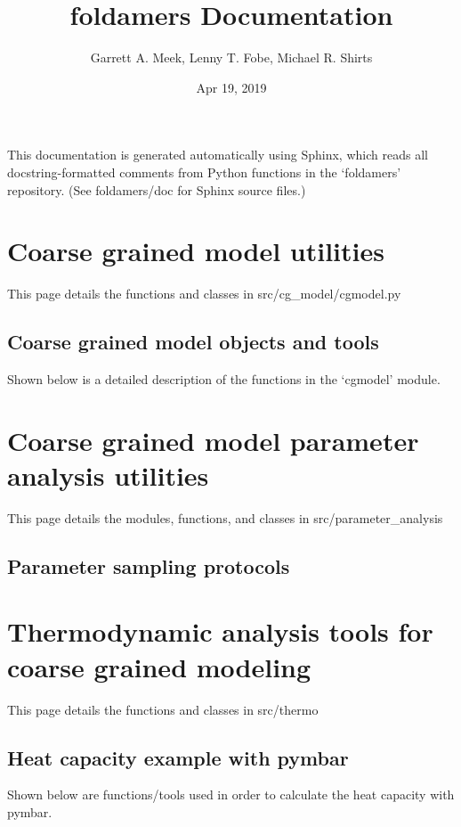 \documentclass[letterpaper,12pt,english,openany,twoside]{sphinxmanual}
\title{foldamers Documentation}
\date{Apr 19, 2019}
\author{Garrett A. Meek, Lenny T. Fobe, Michael R. Shirts}
\begin{document}
\pagestyle{empty}
\sphinxmaketitle
\pagestyle{plain}
\sphinxtableofcontents
\pagestyle{normal}
\label{\detokenize{index::doc}}


This documentation is generated automatically using Sphinx, which reads
all docstring-formatted comments from Python functions in
the ‘foldamers’ repository.  (See foldamers/doc for Sphinx
source files.)


\chapter{Coarse grained model utilities}
\label{\detokenize{cg_model:coarse-grained-model-utilities}}\label{\detokenize{cg_model::doc}}
This page details the functions and classes in src/cg\_model/cgmodel.py


\section{Coarse grained model objects and tools}
\label{\detokenize{cg_model:coarse-grained-model-objects-and-tools}}
Shown below is a detailed description of the functions in the ‘cgmodel’
module.


\chapter{Coarse grained model parameter analysis utilities}
\label{\detokenize{parameter_analysis:coarse-grained-model-parameter-analysis-utilities}}\label{\detokenize{parameter_analysis::doc}}
This page details the modules, functions, and classes
in src/parameter\_analysis


\section{Parameter sampling protocols}
\label{\detokenize{parameter_analysis:parameter-sampling-protocols}}

\chapter{Thermodynamic analysis tools for coarse grained modeling}
\label{\detokenize{thermo:thermodynamic-analysis-tools-for-coarse-grained-modeling}}\label{\detokenize{thermo::doc}}
This page details the functions and classes in src/thermo


\section{Heat capacity example with pymbar}
\label{\detokenize{thermo:heat-capacity-example-with-pymbar}}
Shown below are functions/tools used in order to calculate
the heat capacity with pymbar.
\end{document}
